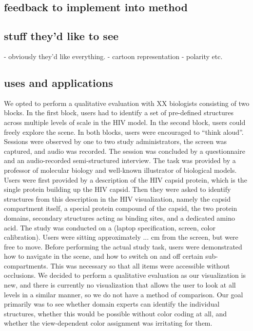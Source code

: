 \documentclass[review,journal]{vgtc}         %
\begin{document}
\subsection{feedback to implement into method}


\subsection{stuff they'd like to see}
- obviously they'd like everything.
- cartoon representation
- polarity etc.


\subsection{uses and applications}


We opted to perform a qualitative evaluation with XX biologists consisting of two blocks.
In the first block, users had to identify a set of pre-defined structures across multiple levels of scale in the HIV model. 
In the second block, users could freely explore the scene.
In both blocks, users were encouraged to “think aloud”. 
Sessions were observed by one to two study administrators, the screen was captured, and audio was recorded. 
The session was concluded by a questionnaire and an audio-recorded semi-structured interview. 
The task was provided by a professor of molecular biology and well-known illustrator of biological models. 
Users were first provided by a description of the HIV capsid protein, which is the single protein building up the HIV capsid.
Then they were asked to identify structures from this description in the HIV visualization, namely the capsid compartment itself, a special protein compound of the capsid, the two protein domains, secondary structures acting as binding sites, and a dedicated amino acid. 
The study was conducted on a (laptop specification, screen, color calibration). 
Users were sitting approximately ... cm from the screen, but were free to move. 
Before performing the actual study task, users were demonstrated how to navigate in the scene, and how to switch on and off certain sub-compartments. 
This was necessary so that all items were accessible without occlusions. 
We decided to perform a qualitative evaluation as our visualization is new, and there is currently no visualization that allows the user to look at all levels in a similar manner, so we do not have a method of comparison.
Our goal primarily was to see whether domain experts can identify the individual structures, whether this would be possible without color coding at all, and whether the view-dependent color assignment was irritating for them. 
\end{document}
